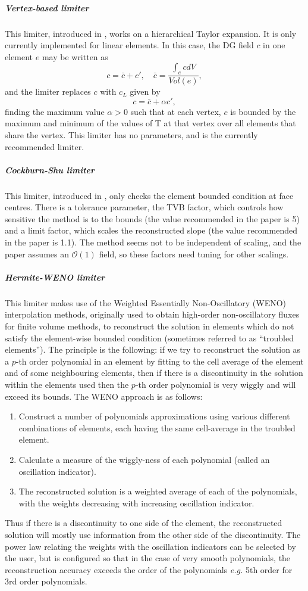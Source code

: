 \subparagraph{Vertex-based limiter}
This limiter, introduced in \cite{Ku2010}, works on a hierarchical
Taylor expansion. It is only currently implemented for linear elements.
In this case, the DG field $c$ in one element $e$ may be written as
\[
c = \bar{c} + c', \quad \bar{c} = \frac{\int_e c dV}{Vol(e)},
\]
and the limiter replaces $c$ with $c_L$ given by
\[
c = \bar{c} + \alpha c',
\]
finding the maximum value $\alpha>0$ such that at each vertex, $c$ is
bounded by the maximum and minimum of the values of T at that vertex
over all elements that share the vertex.  This limiter has no
parameters, and is the currently recommended limiter.

\subparagraph{Cockburn-Shu limiter}
This limiter, introduced in \cite{cockburn2001}, only checks the element
bounded condition at face centres. There is a tolerance parameter, the
TVB factor, which controls how sensitive the method is to the bounds
(the value recommended in the paper is 5) and a limit factor, which
scales the reconstructed slope (the value recommended in the paper is
1.1). The method seems not to be independent of scaling, and the paper
assumes an $\mathcal{O}(1)$ field, so these factors need tuning for
other scalings.

\subparagraph{Hermite-WENO limiter} \label{sec:ND_hermite_weno_limiter}
This limiter makes use of the Weighted Essentially Non-Oscillatory
(WENO) interpolation methods, originally used to obtain high-order
non-oscillatory fluxes for finite volume methods, to reconstruct the
solution in elements which do not satisfy the element-wise bounded
condition (sometimes referred to as ``troubled elements''). The
principle is the following: if we try to reconstruct the solution as a
$p$-th order polynomial in an element by fitting to the cell average
of the element and of some neighbouring elements, then if there is a
discontinuity in the solution within the elements used then the $p$-th
order polynomial is very wiggly and will exceed its bounds. The WENO
approach is as follows:
\begin{enumerate}
\item Construct a number of polynomials approximations using various
  different combinations of elements, each having the same cell-average
  in the troubled element.
\item Calculate a measure of the wiggly-ness of each polynomial (called
an oscillation indicator).
\item The reconstructed solution is a weighted average of each of the
  polynomials, with the weights decreasing with increasing oscillation
  indicator.
\end{enumerate}
Thus if there is a discontinuity to one side of the element, the
reconstructed solution will mostly use information from the other side
of the discontinuity. The power law relating the weights with the
oscillation indicators can be selected by the user, but is configured
so that in the case of very smooth polynomials, the reconstruction
accuracy exceeds the order of the polynomials \emph{e.g.} 5th order for
3rd order polynomials.

